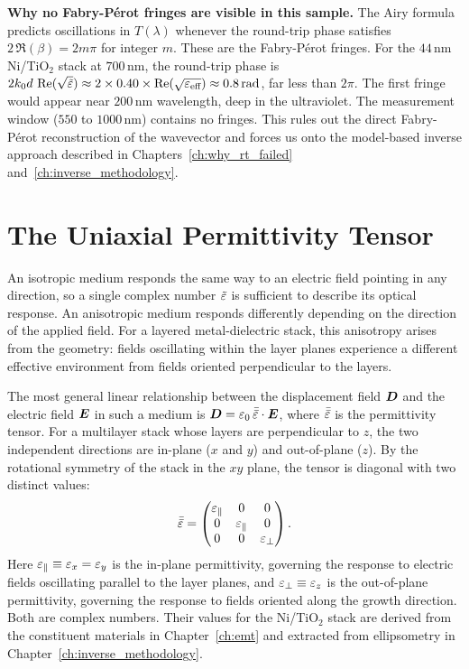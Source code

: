 \begin{resultbox}
\textbf{Why no Fabry-P\'erot fringes are visible in this sample.}
The Airy formula predicts oscillations in $T(\lambda)$ whenever the round-trip
phase satisfies $2\,\Re(\beta) = 2m\pi$ for integer $m$. These are the
Fabry-P\'erot fringes. For the $44$\,nm Ni/TiO$_2$ stack at $700$\,nm, the
round-trip phase is $2k_0 d\,\operatorname{Re}(\sqrt{\tilde{\varepsilon}}) \approx 2 \times 0.40 \times
\operatorname{Re}(\sqrt{\varepsilon_\text{eff}}) \approx 0.8\,\text{rad}$, far less than $2\pi$.
The first fringe would appear near $200$\,nm wavelength, deep in the ultraviolet.
The measurement window ($550$ to $1000$\,nm) contains no fringes. This rules
out the direct Fabry-P\'erot reconstruction of the wavevector and forces us
onto the model-based inverse approach described in
Chapters~\ref{ch:why_rt_failed} and~\ref{ch:inverse_methodology}.
\end{resultbox}

\section{The Uniaxial Permittivity Tensor}

An isotropic medium responds the same way to an electric field pointing in
any direction, so a single complex number $\tilde{\varepsilon}$ is sufficient to
describe its optical response. An anisotropic medium responds differently
depending on the direction of the applied field. For a layered metal-dielectric
stack, this anisotropy arises from the geometry: fields oscillating within
the layer planes experience a different effective environment from fields
oriented perpendicular to the layers.

The most general linear relationship between the displacement field
$\bm{D}$ and the electric field $\bm{E}$ in such a medium is
$\bm{D} = \varepsilon_0\,\bar{\bar{\varepsilon}}\cdot\bm{E}$, where $\bar{\bar{\varepsilon}}$ is the
permittivity tensor. For a multilayer stack whose layers are perpendicular to
$z$, the two independent directions are in-plane ($x$ and $y$) and
out-of-plane ($z$). By the rotational symmetry of the stack in the $xy$ plane,
the tensor is diagonal with two distinct values:
\begin{equation}
  \bar{\bar{\varepsilon}} = \begin{pmatrix}
    \varepsilon_{\parallel} & 0 & 0 \\ 0 & \varepsilon_{\parallel} & 0 \\ 0 & 0 & \varepsilon_{\perp}
  \end{pmatrix}.
  \label{eq:ch2_tensor}
\end{equation}
Here $\varepsilon_{\parallel} \equiv \varepsilon_x = \varepsilon_y$ is the in-plane permittivity, governing
the response to electric fields oscillating parallel to the layer planes, and
$\varepsilon_{\perp} \equiv \varepsilon_z$ is the out-of-plane permittivity, governing the
response to fields oriented along the growth direction. Both are complex
numbers. Their values for the Ni/TiO$_2$ stack are derived from the
constituent materials in Chapter~\ref{ch:emt} and extracted from ellipsometry
in Chapter~\ref{ch:inverse_methodology}.

